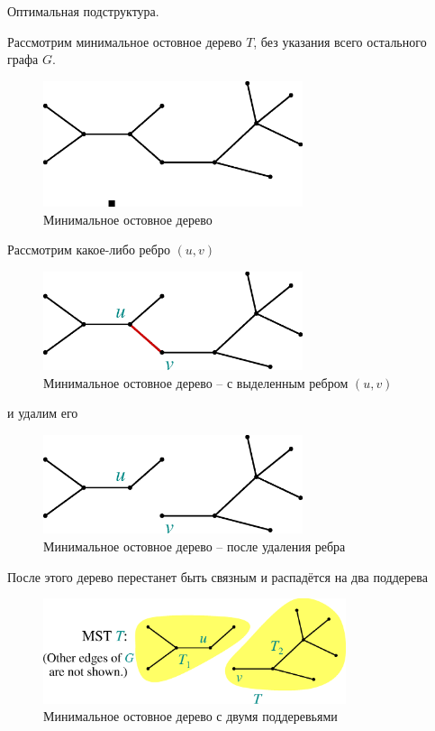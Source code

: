 \documentclass[a4paper,11pt]{article}
\begin{document}
Оптимальная подструктура.

Рассмотрим минимальное остовное дерево $T$, без указания всего остального графа
$G$.

\begin{figure}[ht]
  \centering
  \includegraphics[width=3in]{lecture16/mst1.eps}
  \caption{Минимальное остовное дерево}
  \label{fig:mst1}
\end{figure}

Рассмотрим какое-либо ребро $(u, v)$ 

\begin{figure}[ht]
  \centering
  \includegraphics[width=3in]{lecture16/mst2.eps}
  \caption{Минимальное остовное дерево -- с выделенным ребром $(u, v)$}
  \label{fig:mst2}
\end{figure}

и удалим его

\begin{figure}[ht]
  \centering
  \includegraphics[width=3in]{lecture16/mst3.eps}
  \caption{Минимальное остовное дерево -- после удаления ребра}
  \label{fig:mst3}
\end{figure}

После этого дерево перестанет быть связным и распадётся на два поддерева

\begin{figure}[ht]
  \centering
  \includegraphics[width=3.5in]{lecture16/mst4.eps}
  \caption{Минимальное остовное дерево с двумя поддеревьями}
  \label{fig:mst4}
\end{figure}
\end{document}

